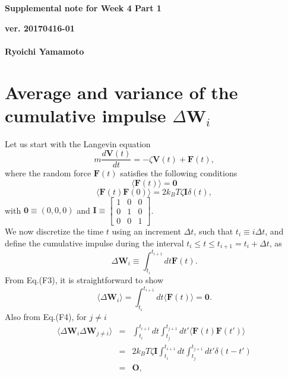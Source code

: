 \documentclass[a4paper,11pt]{article}
\begin{document}
\begin{center}
  {\LARGE\bf Supplemental note for Week 4 Part 1}
  \end{center}
\begin{flushright}
  {\large\bf ver. 20170416-01}\\
 \ \\
{\large\bf Ryoichi Yamamoto}\\
\end{flushright}

\section{Average and variance of the cumulative impulse $\Delta\mathbf{W}_i$}

Let us start with the Langevin equation
\begin{equation}
m\frac{d\mathbf{V}(t)}{dt}={-\zeta\mathbf{V}(t)}+{\mathbf{F}(t)},
\tag{F2}
\end{equation}
where the random force $\mathbf{F}(t)$ satisfies the following conditions
\begin{equation}
\langle \mathbf{F}(t)\rangle=\mathbf{0}
\tag{F3}
\end{equation}
\begin{equation}
\langle \mathbf{F}(t)\mathbf{F}(0)\rangle = {2k_B T\zeta}\mathbf{I}\delta(t),\tag{F4}
\end{equation}
with
$\mathbf{0}\equiv(0,0,0)$ and $\mathbf{I}\equiv\begin{bmatrix}1&0&0\\0&1&0\\0&0&1\end{bmatrix}$.\\
We now discretize the time $t$ using an increment $\Delta t$, such that
$t_i\equiv i\Delta t$, and define the cumulative impulse during the
interval $t_i\le t\le t_{i+1} = t_i + \Delta t$, as
\begin{equation}
\Delta\mathbf{W}_i
\equiv\int_{t_i}^{t_{i+1}} dt\mathbf{F}(t).
\tag{F8}
\end{equation}
From Eq.(F3), it is straightforward to show
\begin{equation}
\langle\Delta\mathbf{W}_i\rangle
=\int_{t_i}^{t_{i+1}} dt\langle\mathbf{F}(t)\rangle=\mathbf{0}.
\tag{F10}
\end{equation}
Also from Eq.(F4), for $j\ne i$
\begin{eqnarray}
\langle\Delta\mathbf{W}_i\Delta\mathbf{W}_{j\ne i}\rangle
&=&\int_{t_i}^{t_{i+1}} dt\int_{t_j}^{t_{j+1}} dt'\langle\mathbf{F}(t)\mathbf{F}(t')\rangle\\
&=&2k_B T\zeta\mathbf{I} \int_{t_i}^{t_{i+1}} dt\int_{t_j}^{t_{j+1}} dt'
\delta(t-t')\\
&=&\mathbf{O},
\end{eqnarray}
\end{document}
